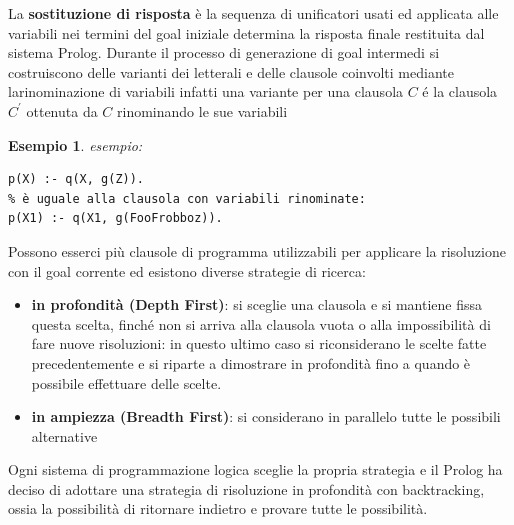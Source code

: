 \documentclass[a4paper]{book}
\newtheorem*{esempio}{Esempio}
\begin{document}
La \textbf{sostituzione di risposta} è la sequenza di unificatori usati ed applicata alle variabili nei termini del goal iniziale
determina la risposta finale restituita dal sistema Prolog.\newline
Durante il processo di generazione di goal intermedi si costruiscono delle varianti dei letterali e delle clausole coinvolti
mediante larinominazione di variabili infatti una variante per una clausola $C$ é la clausola $C^{'}$ ottenuta da $C$ rinominando le sue variabili
\begin{esempio}
esempio:
\begin{verbatim}
p(X) :- q(X, g(Z)).
% è uguale alla clausola con variabili rinominate:
p(X1) :- q(X1, g(FooFrobboz)).
\end{verbatim}
\end{esempio}
Possono esserci più clausole di programma utilizzabili per applicare la risoluzione con il goal corrente ed esistono diverse strategie di ricerca:
\begin{itemize}
\item \textbf{in profondità (Depth First)}: si sceglie una clausola e si mantiene fissa questa scelta, finché non si arriva alla clausola vuota
  o alla impossibilità di fare nuove risoluzioni: in questo ultimo caso si riconsiderano le scelte fatte precedentemente e si riparte a dimostrare
  in profondità fino a quando è possibile effettuare delle scelte.
\item \textbf{in ampiezza (Breadth First)}: si considerano in parallelo tutte le possibili alternative
\end{itemize}
Ogni sistema di programmazione logica sceglie la propria strategia e il Prolog ha deciso di adottare una strategia di risoluzione
in profondità con backtracking, ossia la possibilità di ritornare indietro e provare tutte le possibilità.
\end{document}
